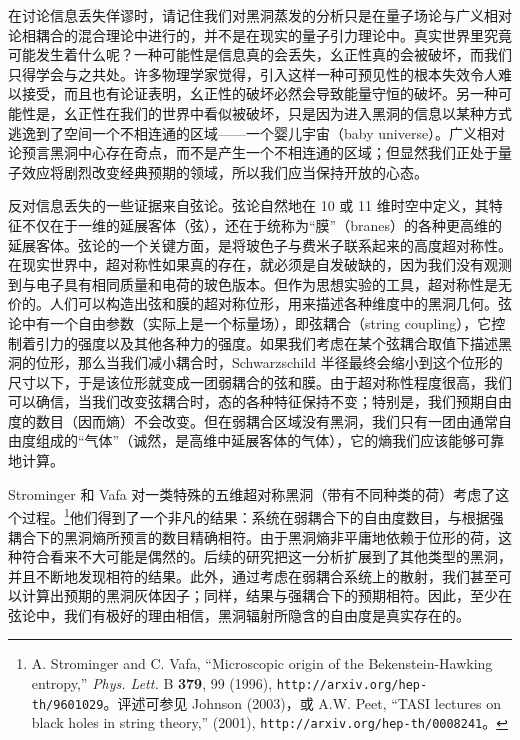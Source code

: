 在讨论信息丢失佯谬时，请记住我们对黑洞蒸发的分析只是在量子场论与广义相对论相耦合的混合理论中进行的，并不是在现实的量子引力理论中。真实世界里究竟可能发生着什么呢？一种可能性是信息真的会丢失，幺正性真的会被破坏，而我们只得学会与之共处。许多物理学家觉得，引入这样一种可预见性的根本失效令人难以接受，而且也有论证表明，幺正性的破坏必然会导致能量守恒的破坏。另一种可能性是，幺正性在我们的世界中看似被破坏，只是因为进入黑洞的信息以某种方式逃逸到了空间一个不相连通的区域——一个婴儿宇宙（baby universe）。广义相对论预言黑洞中心存在奇点，而不是产生一个不相连通的区域；但显然我们正处于量子效应将剧烈改变经典预期的领域，所以我们应当保持开放的心态。

反对信息丢失的一些证据来自弦论。弦论自然地在 10 或 11 维时空中定义，其特征不仅在于一维的延展客体（弦），还在于统称为“膜”（branes）的各种更高维的延展客体。弦论的一个关键方面，是将玻色子与费米子联系起来的高度超对称性。在现实世界中，超对称性如果真的存在，就必须是自发破缺的，因为我们没有观测到与电子具有相同质量和电荷的玻色版本。但作为思想实验的工具，超对称性是无价的。人们可以构造出弦和膜的超对称位形，用来描述各种维度中的黑洞几何。弦论中有一个自由参数（实际上是一个标量场），即弦耦合（string coupling），它控制着引力的强度以及其他各种力的强度。如果我们考虑在某个弦耦合取值下描述黑洞的位形，那么当我们减小耦合时，Schwarzschild 半径最终会缩小到这个位形的尺寸以下，于是该位形就变成一团弱耦合的弦和膜。由于超对称性程度很高，我们可以确信，当我们改变弦耦合时，态的各种特征保持不变；特别是，我们预期自由度的数目（因而熵）不会改变。但在弱耦合区域没有黑洞，我们只有一团由通常自由度组成的“气体”（诚然，是高维中延展客体的气体），它的熵我们应该能够可靠地计算。

Strominger 和 Vafa 对一类特殊的五维超对称黑洞（带有不同种类的荷）考虑了这个过程。\footnote{A. Strominger and C. Vafa, “Microscopic origin of the Bekenstein-Hawking entropy,” \emph{Phys. Lett.} B \textbf{379}, 99 (1996), \texttt{http://arxiv.org/hep-th/9601029}。评述可参见 Johnson (2003)，或 A.W. Peet, “TASI lectures on black holes in string theory,” (2001), \texttt{http://arxiv.org/hep-th/0008241}。}他们得到了一个非凡的结果：系统在弱耦合下的自由度数目，与根据强耦合下的黑洞熵所预言的数目精确相符。由于黑洞熵非平庸地依赖于位形的荷，这种符合看来不大可能是偶然的。后续的研究把这一分析扩展到了其他类型的黑洞，并且不断地发现相符的结果。此外，通过考虑在弱耦合系统上的散射，我们甚至可以计算出预期的黑洞灰体因子；同样，结果与强耦合下的预期相符。因此，至少在弦论中，我们有极好的理由相信，黑洞辐射所隐含的自由度是真实存在的。

